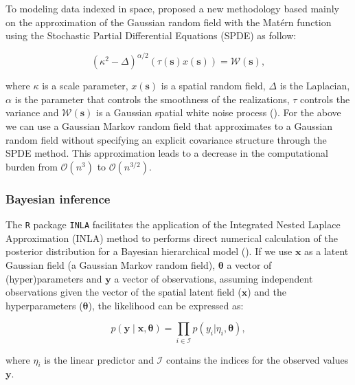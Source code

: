 \documentclass{article}
\begin{document}
To modeling data indexed in space, \cite{lindgren2011explicit} proposed a new methodology based mainly on the approximation of the Gaussian random field with the Matérn function using the Stochastic Partial Differential Equations (SPDE) as follow:

\begin{equation}\label{eqn:eq1}
(\kappa^{2} - \Delta)^{\alpha/2}(\tau(\boldsymbol{s}) x(\boldsymbol{s})) = \boldsymbol{\mathcal{W}(s)},
\end{equation}
 
where $\kappa$ is a scale parameter, $x(\boldsymbol{s})$ is a spatial random field, $\Delta$ is the Laplacian, $\alpha$ is the parameter that controls the smoothness of the realizations, $\tau$ controls the variance and $\boldsymbol{\mathcal{W}(s)}$  is a Gaussian spatial white noise process (\cite{lindgren2015bayesian}). For the above we can use a Gaussian Markov random field that approximates to a Gaussian random field without specifying an explicit covariance structure through the SPDE method. This approximation leads to a decrease in the computational burden from $\mathcal{O}(n^{3})$ to $\mathcal{O}(n^{3/2})$. 


\subsubsection{Bayesian inference}

 The \texttt{R} package \texttt{INLA} facilitates the application of the Integrated Nested Laplace Approximation (INLA) method to performs direct numerical calculation of the posterior distribution for a Bayesian hierarchical model (\cite{rue2009approximate}\cite{martino2009implementing}). If we use $\boldsymbol{x}$ as a latent Gaussian field (a Gaussian Markov random field), $\boldsymbol{\theta}$ a vector of (hyper)parameters and $\boldsymbol{y}$ a vector of observations, assuming independent observations given the vector of the spatial latent field ($\boldsymbol{x}$) and the hyperparameters ($\boldsymbol{\theta}$), the likelihood can be expressed as:

\begin{equation} \label{eqn:eq2}
p(\boldsymbol{y}\mid \boldsymbol{x},\boldsymbol{\theta}) =\prod_{i\in \mathcal{I}} p(y_i|\eta_i,\boldsymbol{\theta}),
\end{equation}

where $\eta_{i}$ is the linear predictor and $\mathcal{I}$ contains the indices for the observed values $\boldsymbol{y}$.  \\
\end{document}
